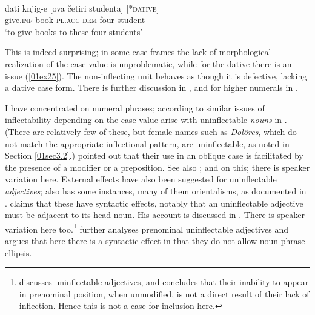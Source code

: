 \documentclass[output=paper,colorlinks,citecolor=brown]{langscibook}
\begin{document}
\begin{exe}
	\ex {} \citep[150]{wechslerzlatic2003} \label{01ex25} \\
	\gll *dati	knjig-e	[ova četiri studenta] \hspace{2.6cm} [*\textsc{dative}] \\
	give.\textsc{inf}	book\textsc{-pl.acc}	\textsc{dem} four student \\
	\trans ‘to give books to these four students’
\end{exe}

This is indeed surprising; in some case frames the lack of morphological realization of the case value is unproblematic, while for the dative there is an issue (\ref{01ex25}). The non-inflecting unit behaves as though it is defective, lacking a dative case form. There is further discussion in \citet[148--152]{wechslerzlatic2003}, \citet{franks2024} and for higher numerals in \citet{boskovic2006}.

I have concentrated on numeral phrases; according to \citep[133--140]{wechslerzlatic2003} similar issues of inflectability depending on the case value arise with uninflectable \textit{nouns} in . (There are relatively few of these, but female names such as \textit{Dolôres}, which do not match the appropriate  inflectional pattern, are uninflectable, as noted in Section \ref{01sec3.2}.) \citet[107n3]{ivic1972} pointed out that their use in an oblique case is facilitated by the presence of a modifier or a preposition. See also \citet{boskovic2006, boskovic2009}; \citet{horvath2014} and \citet[103--111]{adamson2019} on this; there is speaker variation here. External effects have also been suggested for uninflectable \textit{adjectives};  also has some instances, many of them orientalisms, as documented in \citet{nikolic1996}. \citet[22]{boskovic2013} claims that these have syntactic effects, notably that an uninflectable adjective must be adjacent to its head noun. His account is discussed in \citet[115--121]{adamson2019}. There is speaker variation here too.\footnote{\citet[121--131]{adamson2019} discusses  uninflectable adjectives, and concludes that their inability to appear in prenominal position, when unmodified, is not a direct result of their lack of inflection. Hence this is not a case for inclusion here.} \citet[160--184]{adamson2019} further analyses  prenominal uninflectable adjectives and argues that here there is a syntactic effect in that they do not allow noun phrase ellipsis.
\end{document}
